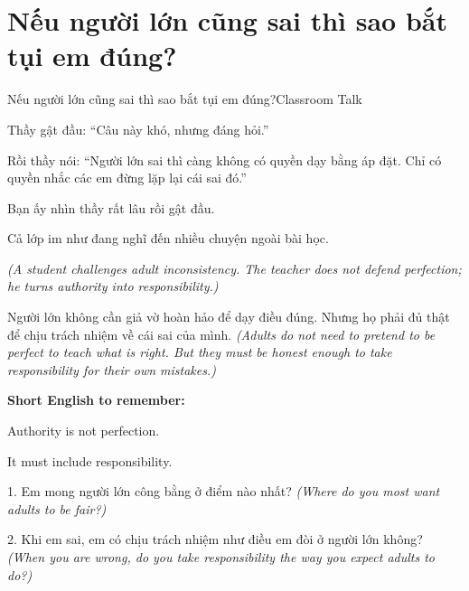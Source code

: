 \section{Nếu người lớn cũng sai thì sao bắt tụi em đúng?}
\begin{truyen}{Nếu người lớn cũng sai thì sao bắt tụi em đúng?}{Classroom Talk}

Thầy gật đầu: ``Câu này khó, nhưng đáng hỏi.''

Rồi thầy nói: ``Người lớn sai thì càng không có quyền dạy bằng áp đặt. Chỉ có quyền nhắc các em đừng lặp lại cái sai đó.''

Bạn ấy nhìn thầy rất lâu rồi gật đầu.

Cả lớp im như đang nghĩ đến nhiều chuyện ngoài bài học.

\textit{(A student challenges adult inconsistency. The teacher does not defend perfection; he turns authority into responsibility.)}
\end{truyen}

\begin{baihoc}
Người lớn không cần giả vờ hoàn hảo để dạy điều đúng. Nhưng họ phải đủ thật để chịu trách nhiệm về cái sai của mình.
\textit{(Adults do not need to pretend to be perfect to teach what is right. But they must be honest enough to take responsibility for their own mistakes.)}
\end{baihoc}

\begin{ghinhoanh}
\textbf{Short English to remember:}

Authority is not perfection.

It must include responsibility.
\end{ghinhoanh}

\begin{tuhocnhanh}
1. Em mong người lớn công bằng ở điểm nào nhất? \textit{(Where do you most want adults to be fair?)}

2. Khi em sai, em có chịu trách nhiệm như điều em đòi ở người lớn không? \textit{(When you are wrong, do you take responsibility the way you expect adults to do?)}
\end{tuhocnhanh}
\ngancach

